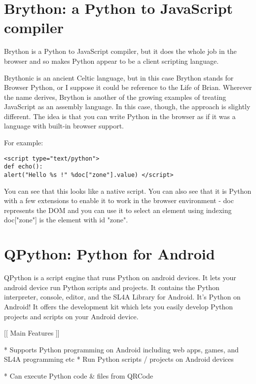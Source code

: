 \newpage
\section{Brython: a Python to JavaScript compiler}

Brython is a Python to JavaScript compiler, but it does the whole job in the browser and so makes Python appear to be a client scripting language. 

Brythonic is an ancient Celtic language, but in this case Brython stands for Browser Python, or I suppose it could be reference to the Life of Brian. Wherever the name derives, Brython is another of the growing examples of treating JavaScript as an assembly language. In this case, though, the approach is slightly different. The idea is that you can write Python in the browser as if it was a language with built-in browser support. 

For example:

\begin{lstlisting}
<script type="text/python">
def echo():
alert("Hello %s !" %doc["zone"].value) </script>
\end{lstlisting}

You can see that this looks like a native script. You can also see that it is Python with a few extensions to enable it to work in the browser environment - doc represents the DOM and you can use it to select an element using indexing doc["zone"] is the element with id "zone". 








\newpage
\section{QPython: Python for Android}

QPython is a script engine that runs Python on android devices. It lets your android device run Python scripts and projects. It contains the Python interpreter, console, editor, and the SL4A Library for Android. It’s Python on Android! It offers the development kit which lets you easily develop Python projects and scripts on your Android device.


[[ Main Features ]] 

* Supports Python programming on Android including web apps, games, and SL4A programming etc * Run Python scripts / projects on Android devices 

* Can execute Python code \& files from QRCode 


